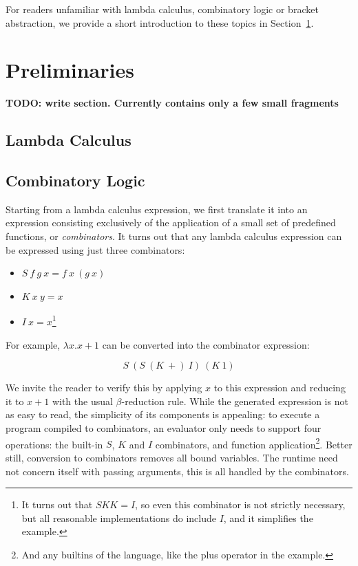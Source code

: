 \documentclass[conference]{IEEEtran}
\begin{document}
For readers unfamiliar with lambda calculus, combinatory logic or bracket abstraction, we provide a short introduction to these topics in Section~\ref{sec:prelim}.

\section{Preliminaries}
\label{sec:prelim}
\textbf{TODO: write section. Currently contains only a few small fragments}
\subsection{Lambda Calculus}

\subsection{Combinatory Logic}
Starting from a lambda calculus expression, we first translate it into an expression consisting exclusively of the application of a small set of predefined functions, or \textit{combinators}.
It turns out that any lambda calculus expression can be expressed using just three combinators:
\begin{itemize}
    \item $S \ f \ g \ x = f \ x \ (g \ x)$
    \item $K \ x \ y = x$
    \item $I \ x = x$\footnote{It turns out that $SKK = I$, so even this combinator is not strictly necessary, but all reasonable implementations do include $I$, and it simplifies the example.}
\end{itemize}

For example, $\lambda x.x+1$ can be converted into the combinator expression:

\[
    S \ (S \  (K \  +) \  I) \ (K \ 1)
\]

We invite the reader to verify this by applying $x$ to this expression and reducing it to $x+1$ with the usual $\beta$-reduction rule.
While the generated expression is not as easy to read, the simplicity of its components is appealing: to execute a program compiled to combinators, an evaluator only needs to support four operations: the built-in $S$, $K$ and $I$ combinators, and function application\footnote{And any builtins of the language, like the plus operator in the example.}.
Better still, conversion to combinators removes all bound variables.
The runtime need not concern itself with passing arguments, this is all handled by the combinators.
\end{document}
